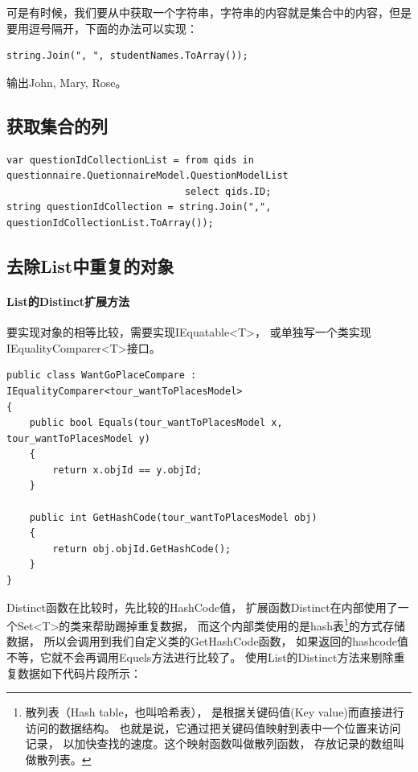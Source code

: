 \documentclass{book}
\begin{document}
可是有时候，我们要从中获取一个字符串，字符串的内容就是集合中的内容，但是要用逗号隔开，下面的办法可以实现：

\begin{lstlisting}[language={[Sharp]C}]
string.Join(", ", studentNames.ToArray());
\end{lstlisting}

输出John, Mary, Rose。

\subsection{获取集合的列}

\begin{lstlisting}[language={[Sharp]C}]
var questionIdCollectionList = from qids in questionnaire.QuetionnaireModel.QuestionModelList
                               select qids.ID;
string questionIdCollection = string.Join(",", questionIdCollectionList.ToArray());
\end{lstlisting}

\subsection{去除List中重复的对象}

\paragraph{List的Distinct扩展方法}要实现对象的相等比较，需要实现IEquatable<T>，
或单独写一个类实现IEqualityComparer<T>接口。

\begin{lstlisting}[language={[Sharp]C}]
public class WantGoPlaceCompare : IEqualityComparer<tour_wantToPlacesModel>
{
    public bool Equals(tour_wantToPlacesModel x, tour_wantToPlacesModel y)
    {
        return x.objId == y.objId;
    }

    public int GetHashCode(tour_wantToPlacesModel obj)
    {
        return obj.objId.GetHashCode();
    }
}
\end{lstlisting}

Distinct函数在比较时，先比较的HashCode值，
扩展函数Distinct在内部使用了一个Set<T>的类来帮助踢掉重复数据，
而这个内部类使用的是hash表\footnote{散列表（Hash table，也叫哈希表），
是根据关键码值(Key value)而直接进行访问的数据结构。
也就是说，它通过把关键码值映射到表中一个位置来访问记录，
以加快查找的速度。这个映射函数叫做散列函数，
存放记录的数组叫做散列表。}的方式存储数据，
所以会调用到我们自定义类的GetHashCode函数，
如果返回的hashcode值不等，它就不会再调用Equels方法进行比较了。
使用List的Distinct方法来剔除重复数据如下代码片段所示：
\end{document}
